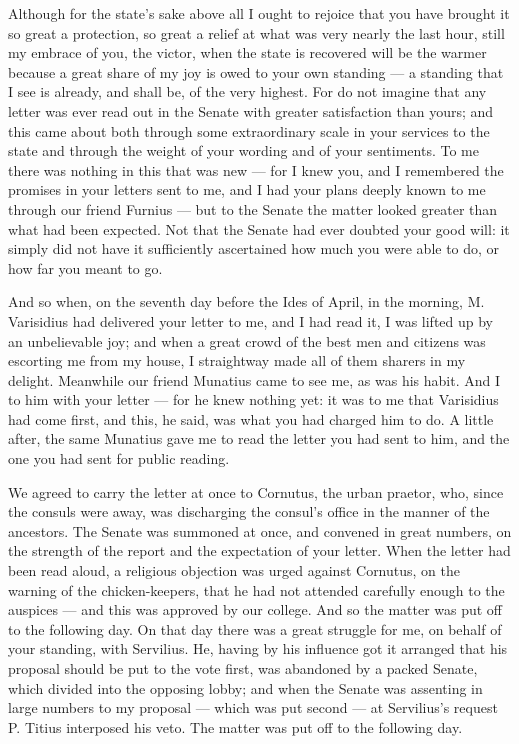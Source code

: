 

 Although for the state's sake above all I ought to rejoice that you have brought it so great a protection, so great a relief at what was very nearly the last hour, still my embrace of you, the victor, when the state is recovered will be the warmer because a great share of my joy is owed to your own standing --- a standing that I see is already, and shall be, of the very highest. For do not imagine that any letter was ever read out in the Senate with greater satisfaction than yours; and this came about both through some extraordinary scale in your services to the state and through the weight of your wording and of your sentiments. To me there was nothing in this that was new --- for I knew you, and I remembered the promises in your letters sent to me, and I had your plans deeply known to me through our friend Furnius --- but to the Senate the matter looked greater than what had been expected. Not that the Senate had ever doubted your good will: it simply did not have it sufficiently ascertained how much you were able to do, or how far you meant to go.

 And so when, on the seventh day before the Ides of April, in the morning, M. Varisidius had delivered your letter to me, and I had read it, I was lifted up by an unbelievable joy; and when a great crowd of the best men and citizens was escorting me from my house, I straightway made all of them sharers in my delight. Meanwhile our friend Munatius came to see me, as was his habit. And I to him with your letter --- for he knew nothing yet: it was to me that Varisidius had come first, and this, he said, was what you had charged him to do. A little after, the same Munatius gave me to read the letter you had sent to him, and the one you had sent for public reading.

 We agreed to carry the letter at once to Cornutus, the urban praetor, who, since the consuls were away, was discharging the consul's office in the manner of the ancestors. The Senate was summoned at once, and convened in great numbers, on the strength of the report and the expectation of your letter. When the letter had been read aloud, a religious objection was urged against Cornutus, on the warning of the chicken-keepers, that he had not attended carefully enough to the auspices --- and this was approved by our college. And so the matter was put off to the following day. On that day there was a great struggle for me, on behalf of your standing, with Servilius. He, having by his influence got it arranged that his proposal should be put to the vote first, was abandoned by a packed Senate, which divided into the opposing lobby; and when the Senate was assenting in large numbers to my proposal --- which was put second --- at Servilius's request P. Titius interposed his veto. The matter was put off to the following day.

